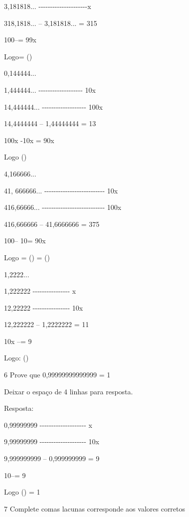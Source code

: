 3,181818...
-\/-\/-\/-\/-\/-\/-\/-\/-\/-\/-\/-\/-\/-\/-\/-\/-\/-\/-\/-\/-x

318,1818... -- 3,181818... = 315

100\times --\times = 99x

Logo= ()

\item 0,144444...

1,444444... -\/-\/-\/-\/-\/-\/-\/-\/-\/-\/-\/-\/-\/-\/-\/-\/-\/-\/- 10x

14,444444... -\/-\/-\/-\/-\/-\/-\/-\/-\/-\/-\/-\/-\/-\/-\/-\/-\/-\/-
100x

14,4444444 -- 1,44444444 = 13

100x -10x = 90x

Logo ()

\item 4,166666...

41, 666666...
-\/-\/-\/-\/-\/-\/-\/-\/-\/-\/-\/-\/-\/-\/-\/-\/-\/-\/-\/-\/-\/-\/-\/-\/-\/-
10x

416,66666...
-\/-\/-\/-\/-\/-\/-\/-\/-\/-\/-\/-\/-\/-\/-\/-\/-\/-\/-\/-\/-\/-\/-\/-\/-\/-\/-
100x

416,666666 -- 41,6666666 = 375

100\times -- 10\times = 90x

Logo = () = ()

\item 1,2222...

1,222222 -\/-\/-\/-\/-\/-\/-\/-\/-\/-\/-\/-\/-\/-\/-\/- x

12,22222 -\/-\/-\/-\/-\/-\/-\/-\/-\/-\/-\/-\/-\/-\/-\/- 10x

12,222222 -- 1,2222222 = 11

10x --\times = 9

Logo: ()

\num{6} Prove que 0,99999999999999 = 1

Deixar o espaço de 4 linhas para resposta.

Resposta:

0,99999999 -\/-\/-\/-\/-\/-\/-\/-\/-\/-\/-\/-\/-\/-\/-\/-\/-\/-\/-\/- x

9,99999999 -\/-\/-\/-\/-\/-\/-\/-\/-\/-\/-\/-\/-\/-\/-\/-\/-\/-\/-\/-
10x

9,999999999 -- 0,999999999 = 9

10\times --\times = 9

Logo () = 1

\num{7} Complete com\times as lacunas corresponde aos valores corretos

